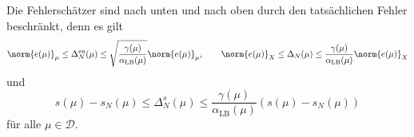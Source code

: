 \begin{Satz}
    Die Fehlerschätzer sind nach unten und nach oben durch den tatsächlichen Fehler beschränkt, denn es gilt
    \begin{equation}
        \norm{e(\mu)}_{\mu} \leq \Delta^{\text{en}}_N(\mu) \leq \sqrt{\frac{\gamma(\mu)}{\alpha_{\text{LB}}(\mu)}} \norm{e(\mu)}_{\mu}, \qquad
        \norm{e(\mu)}_X \leq \Delta_N(\mu) \leq \frac{\gamma(\mu)}{\alpha_{\text{LB}}(\mu)}\norm{e(\mu)}_X
    \end{equation}
    und
    \begin{equation}
         s(\mu) - s_N(\mu) \leq \Delta^s_N(\mu) \leq \frac{\gamma(\mu)}{\alpha_{\text{LB}}(\mu)} \left( s(\mu) - s_N(\mu) \right)
    \end{equation}
    für alle $\mu \in \mathcal D$.





\end{Satz}
